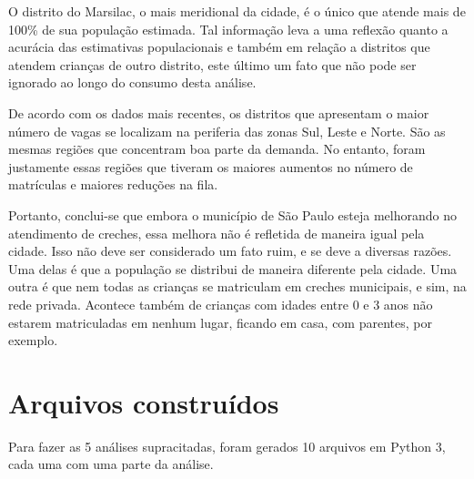 \documentclass[12pt, a4paper]{article}
\begin{document}
O distrito do Marsilac, o mais meridional da cidade, é o único que atende mais de 100\% de sua população estimada. Tal informação leva a uma reflexão quanto a acurácia das estimativas populacionais e também em relação a distritos que atendem crianças de outro distrito, este último um fato que não pode ser ignorado ao longo do consumo desta análise.

De acordo com os dados mais recentes, os distritos que apresentam o maior número de vagas se localizam na periferia das zonas Sul, Leste e Norte. São as mesmas regiões que concentram boa parte da demanda. No entanto, foram justamente essas regiões que tiveram os maiores aumentos no número de matrículas e maiores reduções na fila.

Portanto, conclui-se que embora o município de São Paulo esteja melhorando no atendimento de creches, essa melhora não é refletida de maneira igual pela cidade. Isso não deve ser considerado um fato ruim, e se deve a diversas razões. Uma delas é que a população se distribui de maneira diferente pela cidade. Uma outra é que nem todas as crianças se matriculam em creches municipais, e sim, na rede privada. Acontece também de crianças com idades entre 0 e 3 anos não estarem matriculadas em nenhum lugar, ficando em casa, com parentes, por exemplo.

\section{Arquivos construídos}

Para fazer as 5 análises supracitadas, foram gerados 10 arquivos em Python 3, cada uma com uma parte da análise.
\end{document}
